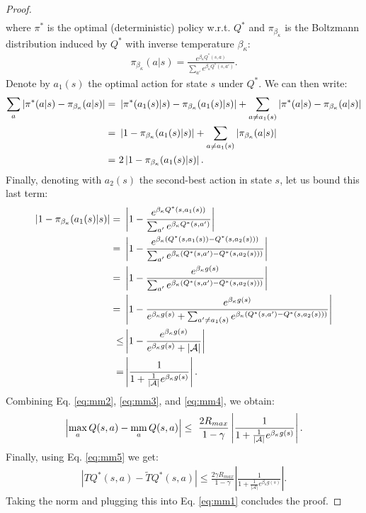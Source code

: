 \documentclass{article}
\newcommand{\mm}{\operatornamewithlimits{mm}}
\newcommand{\wt}[1]{\widetilde{#1}}
\newcommand{\abs}[1]{\left\lvert #1 \right\rvert}
\begin{document}
\begin{proof}
\begin{align}
\end{align}
where $\pi^*$ is the optimal (deterministic) policy w.r.t. $Q^*$ and $\pi_{\beta_{\kappa}}$ is the Boltzmann distribution induced by $Q^*$ with inverse temperature $\beta_{\kappa}$:
\begin{align*}
\pi_{\beta_{\kappa}}(a|s) = \frac{e^{\beta_{\kappa} Q^*(s,a)}}{\sum_{a'}e^{\beta_{\kappa} Q^*(s,a')}}.
\end{align*}
Denote by $a_1(s)$ the optimal action for state $s$ under $Q^*$. We can then write:
\begin{align} \label{eq:mm3}
\sum_a\abs{\pi^*(a|s) - \pi_{\beta_{\kappa}}(a|s)} =\ & \abs{\pi^*(a_1(s)|s) - \pi_{\beta_{\kappa}}(a_1(s)|s)} + \sum_{a \neq a_1(s)}\abs{\pi^*(a|s) - \pi_{\beta_{\kappa}}(a|s)}\notag\\ =\ & \abs{1 - \pi_{\beta_{\kappa}}(a_1(s)|s)} + \sum_{a \neq a_1(s)}\abs{\pi_{\beta_{\kappa}}(a|s)}\notag\\ =\ & 2\abs{1 - \pi_{\beta_{\kappa}}(a_1(s)|s)}.
\end{align}
Finally, denoting with $a_2(s)$ the second-best action in state $s$, let us bound this last term:
\begin{align} \label{eq:mm4}
\abs{1 - \pi_{\beta_{\kappa}}(a_1(s)|s)} =\ & \abs{1 - \frac{e^{\beta_{\kappa} Q^*(s,a_1(s))}}{\sum_{a'}e^{\beta_{\kappa} Q^*(s,a')}}}\notag\\ =\ & \abs{1 - \frac{e^{\beta_{\kappa} \left( Q^*(s,a_1(s)) - Q^*(s,a_2(s)) \right)}}{\sum_{a'}e^{\beta_{\kappa} \left( Q^*(s,a') - Q^*(s,a_2(s))\right)}}}\notag\\ =\ & \abs{1 - \frac{e^{\beta_{\kappa} g(s)}}{\sum_{a'}e^{\beta_{\kappa} \left( Q^*(s,a') - Q^*(s,a_2(s))\right)}}}\notag\\ =\ & \abs{1 - \frac{e^{\beta_{\kappa} g(s)}}{e^{\beta_{\kappa} g(s)} + \sum_{a' \neq a_1(s)}e^{\beta_{\kappa} \left( Q^*(s,a') - Q^*(s,a_2(s))\right)}}}\notag\\ \leq & \abs{1 - \frac{e^{\beta_{\kappa} g(s)}}{e^{\beta_{\kappa} g(s)} + \abs{\mathcal{A}}}}\notag\\ = & \abs{\frac{1}{1 + \frac{1}{\abs{\mathcal{A}}}e^{\beta_{\kappa} g(s)}}}.
\end{align}
Combining Eq. \eqref{eq:mm2}, \eqref{eq:mm3}, and \eqref{eq:mm4}, we obtain:
\begin{align*}
\abs{\max_a Q(s,a) - \mm_a Q(s,a)} \leq\ \frac{2 R_{max}}{1-\gamma}\abs{\frac{1}{1 + \frac{1}{\abs{\mathcal{A}}}e^{\beta_{\kappa} g(s)}}}.
\end{align*}
Finally, using Eq. \eqref{eq:mm5} we get:
\begin{align*}
\abs{TQ^*(s,a) - \wt{T}Q^*(s,a)} \leq \frac{2\gamma R_{max}}{1-\gamma}\abs{\frac{1}{1 + \frac{1}{\abs{\mathcal{A}}}e^{\beta_{\kappa} g(s)}}}.
\end{align*}
Taking the norm and plugging this into Eq. \eqref{eq:mm1} concludes the proof.
\end{proof}
\end{document}
